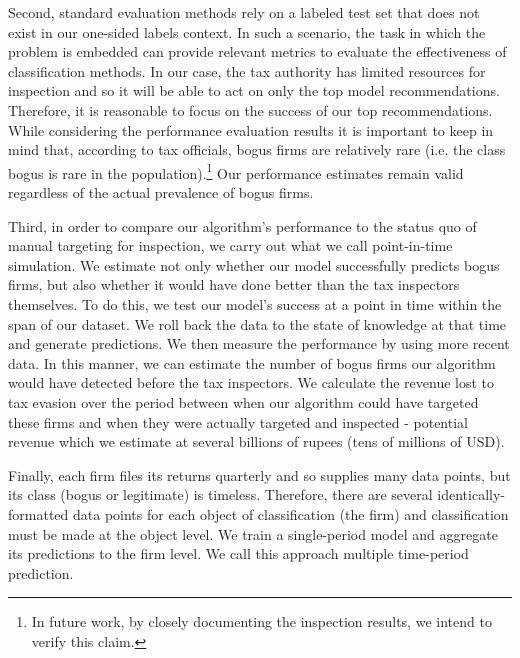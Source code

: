 Second, standard evaluation methods rely on a labeled test set that does not exist in our one-sided labels context. In such a scenario, the task in which the problem is embedded can provide relevant metrics to evaluate the effectiveness of classification methods. In our case, the tax authority has limited resources for inspection and so it will be able to act on only the top model
recommendations. Therefore, it is reasonable to focus on the success of our top recommendations. While considering the performance evaluation results it is important to keep in mind that, according to tax officials, bogus firms are relatively rare (i.e. the class bogus is rare in the population).\footnote{In future work, by  closely documenting the inspection results, we intend to verify this claim.} Our performance estimates remain  valid regardless of the actual prevalence of bogus firms.

Third, in order to compare our algorithm's performance to the status quo of manual targeting for inspection, we carry out what we call point-in-time simulation. We estimate not only whether our model successfully predicts bogus firms, but also whether it would have done better than the tax inspectors themselves. To do this, we test our model's success at a point in time within the span of our dataset. We roll back the data to the state of knowledge at that time and generate predictions. We then measure the performance by using more recent data. In this manner, we can estimate the number of bogus firms our algorithm would have detected before the tax inspectors. We calculate the revenue lost to tax evasion over the period between when our algorithm could have targeted these firms and when they were actually targeted and inspected - potential revenue which we estimate at several billions of rupees (tens of millions of USD).

Finally, each firm files its returns quarterly and so supplies many data points, but its class (bogus or legitimate) is timeless. Therefore, there are several identically-formatted data points for each object of classification (the firm) and classification must be made at the object level. We train a single-period model and aggregate its predictions to the firm level. We call this approach multiple time-period prediction.

